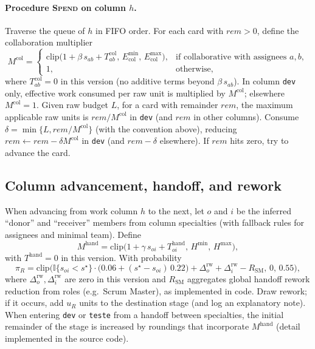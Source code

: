 \paragraph{Procedure \textsc{Spend} on column $h$.}
Traverse the queue of $h$ in FIFO order. For each card with $\textit{rem}>0$, define the collaboration multiplier
\[
M^{\text{col}} =
\begin{cases}
\mathrm{clip}\big(1+\beta\, s_{ab} + T^{\text{col}}_{ab},\,E^{\min}_{\text{col}},\,E^{\max}_{\text{col}}\big), & \text{if collaborative with assignees }a,b,\\
1, & \text{otherwise},
\end{cases}
\]
where $T^{\text{col}}_{ab}=0$ in this version (no additive terms beyond $\beta\,s_{ab}$). In column \texttt{dev} only, effective work consumed per raw unit is multiplied by $M^{\text{col}}$; elsewhere $M^{\text{col}}=1$. Given raw budget $L$, for a card with remainder $\textit{rem}$, the maximum applicable raw units is $\textit{rem}/M^{\text{col}}$ in \texttt{dev} (and $\textit{rem}$ in other columns). Consume $\delta=\min\{L,\textit{rem}/M^{\text{col}}\}$ (with the convention above), reducing $\textit{rem}\leftarrow \textit{rem}-\delta M^{\text{col}}$ in \texttt{dev} (and $\textit{rem}-\delta$ elsewhere). If $\textit{rem}$ hits zero, try to advance the card.

\subsection{Column advancement, handoff, and rework}
When advancing from work column $h$ to the next, let $o$ and $i$ be the inferred ``donor'' and ``receiver'' members from column specialties (with fallback rules for assignees and minimal team). Define
\[
M^{\text{hand}} = \mathrm{clip}\big(1+\gamma\, s_{oi} + T^{\text{hand}}_{oi},\,H^{\min},\,H^{\max}\big),
\]
with $T^{\text{hand}}=0$ in this version. With probability
\[
\pi_R = \mathrm{clip}\Big(\mathbb{I}\{s_{oi}<s^\star\}\cdot\big(0.06+(s^\star-s_{oi})\,0.22\big) + \Delta^{\text{rw}}_o+\Delta^{\text{rw}}_i - R_{\text{SM}},\,0,\,0.55\Big),
\]
where $\Delta^{\text{rw}}_o,\Delta^{\text{rw}}_i$ are zero in this version and $R_{\text{SM}}$ aggregates global handoff rework reduction from roles (e.g.\ Scrum Master), as implemented in code. Draw rework; if it occurs, add $u_R$ units to the destination stage (and log an explanatory note). When entering \texttt{dev} or \texttt{teste} from a handoff between specialties, the initial remainder of the stage is increased by roundings that incorporate $M^{\text{hand}}$ (detail implemented in the source code).

